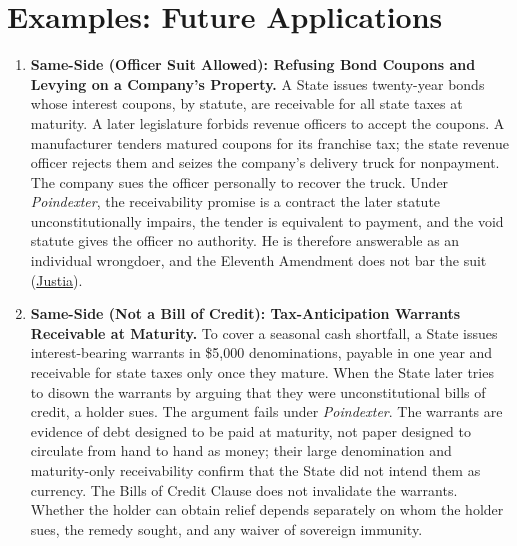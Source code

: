 \documentclass[12pt]{article}
\begin{document}
\section{Examples: Future Applications}
\begin{enumerate}

\item \textbf{Same-Side (Officer Suit Allowed): Refusing Bond Coupons and Levying on a Company's Property.} A State issues twenty-year bonds whose interest coupons, by statute, are receivable for all state taxes at maturity. A later legislature forbids revenue officers to accept the coupons. A manufacturer tenders matured coupons for its franchise tax; the state revenue officer rejects them and seizes the company's delivery truck for nonpayment. The company sues the officer personally to recover the truck. Under \textit{Poindexter}, the receivability promise is a contract the later statute unconstitutionally impairs, the tender is equivalent to payment, and the void statute gives the officer no authority. He is therefore answerable as an individual wrongdoer, and the Eleventh Amendment does not bar the suit (\href{https://supreme.justia.com/cases/federal/us/114/270/}{Justia}).

\item \textbf{Same-Side (Not a Bill of Credit): Tax-Anticipation Warrants Receivable at Maturity.} To cover a seasonal cash shortfall, a State issues interest-bearing warrants in \$5{,}000 denominations, payable in one year and receivable for state taxes only once they mature. When the State later tries to disown the warrants by arguing that they were unconstitutional bills of credit, a holder sues. The argument fails under \textit{Poindexter}. The warrants are evidence of debt designed to be paid at maturity, not paper designed to circulate from hand to hand as money; their large denomination and maturity-only receivability confirm that the State did not intend them as currency. The Bills of Credit Clause does not invalidate the warrants. Whether the holder can obtain relief depends separately on whom the holder sues, the remedy sought, and any waiver of sovereign immunity.


\end{enumerate}
\end{document}
